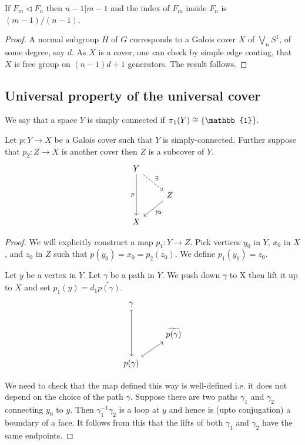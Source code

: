 \begin{theorem}
  If $F_m \triangleleft F_n$ then $n - 1 | m - 1$ and the index of $F_m$ inside $F_n$ is $(m-1)/(n-1)$.
\end{theorem}
\begin{proof}
  A normal subgroup $H$ of $G$ corresponds to a Galois cover $X$ of $\bigvee \limits_n S^1$, of some degree, say $d$.
  As $X$ is a cover, one can check by simple edge conting, that $X$ is free group on $(n-1)d + 1$ generators.
  The result follows.
\end{proof}









\subsection{Universal property of the universal cover}

We say that a space $Y$ is simply connected if $\pi_1(Y) \cong \set{\mathbb{1}}$.
\begin{proposition}
  Let $p:Y \rightarrow X$ be a Galois cover such that $Y$ is simply-connected.
  Further suppose that $p_2:Z \rightarrow X$ is another cover then $Z$ is a subcover of $Y$.
  \begin{equation*}
    \begin{tikzcd}
      Y \ar[rd, dashed, "\exists"] \ar[dd, "p"']\\
        & Z \ar[ld,"p_2"] \\
      X
    \end{tikzcd}
  \end{equation*}
\end{proposition}
\begin{proof}
  We will explicitly construct a map $p_1: Y \rightarrow Z$.
  Pick vertices $y_0$ in $Y$, $x_0$ in $X$, and $z_0$ in $Z$ such that $p(y_0) = x_0 = p_2(z_0)$.
  We define $p_1(y_0) = z_0$.

  Let $y$ be a vertex in $Y$. Let $\gamma$ be a path in $Y$.
  We push down $\gamma$ to X then lift it up to $X$ and set $p_1(y) = d_1 \widetilde{p(\gamma)}$.
  \begin{equation*}
    \begin{tikzcd}
      \gamma \ar[dd, mapsto]\\
        & \widetilde{p(\gamma)}  \\
      p(\gamma) \ar[ur, mapsto]
    \end{tikzcd}
  \end{equation*}

  We need to check that the map defined this way is well-defined i.e. it does not depend on the choice of the path $\gamma$.
  Suppose there are two paths $\gamma_1$ and $\gamma_2$ connecting $y_0$ to $y$.
  Then $\gamma_1^{-1} \gamma_2$ is a loop at $y$ and hence is (upto conjugation) a boundary of a face.
  It follows from this that the lifts of both $\gamma_1$ and $\gamma_2$ have the same endpoints.
\end{proof}


